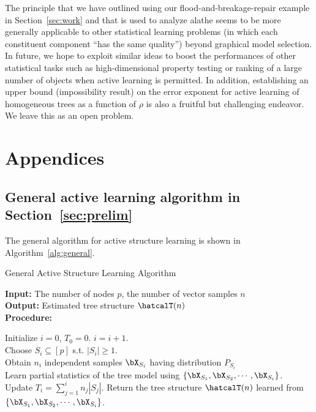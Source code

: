 \documentclass[11pt,onecolumn]{article}
\newcommand{\Passive}{{\rm passive}}
\begin{document}
The principle that we have outlined using our flood-and-breakage-repair example in Section~\ref{sec:work} and that is used to analyze \ac{alathe} seems to be  more generally applicable to other statistical learning problems (in which each constituent component ``has the same quality'') beyond graphical model selection. In future, we hope to exploit similar ideas to boost the performances of other statistical tasks such as high-dimensional property testing or ranking of a large number of objects when active learning is permitted. In addition, establishing an upper bound (impossibility result) on the error exponent for active learning of homogeneous trees as a function of $\rho$ is also a fruitful but challenging endeavor. We leave this as an open problem. 

\section{Appendices}\label{sec:app}

\subsection{General active learning algorithm in Section~\ref{sec:prelim}}\label{sec:appgenalgo}
The general algorithm for active structure learning is shown in Algorithm~\ref{alg:general}.
\begin{algorithm}[t]
\label{alg:general}
	\caption{General Active Structure Learning Algorithm}
	\textbf{Input:}  The number of nodes $p$, the number of vector samples $n$\\
	\textbf{Output:} Estimated tree structure $\hatcalT(n)$ \\
	\textbf{Procedure:}
	\begin{algorithmic}[1]\label{algo:generalal}
		\STATE Initialize $i=0$, $T_{0}=0$.
			\STATE $i=i+1$.\\
			\STATE Choose $S_{i}\subseteq [p]$ s.t. $|S_{i}|\geq 1$.\\
			\STATE Obtain $n_{i}$ independent samples $\bX_{S_{i}}$ having distribution $P_{S_{i}}$\\
			\STATE Learn partial statistics of the tree model using $\{\bX_{S_{1}},\bX_{S_{2}},\cdots,\bX_{S_{i}}\}$.\\
			\STATE Update $T_{i}=\sum_{j=1}^{i}n_{j}|S_{j}|$.
		\ENDWHILE
		\STATE Return the tree structure $\hatcalT(n)$ learned from $\{\bX_{S_{1}},\bX_{S_{2}},\cdots,\bX_{S_{i}}\}$.
	\end{algorithmic}
\end{algorithm}
\end{document}
